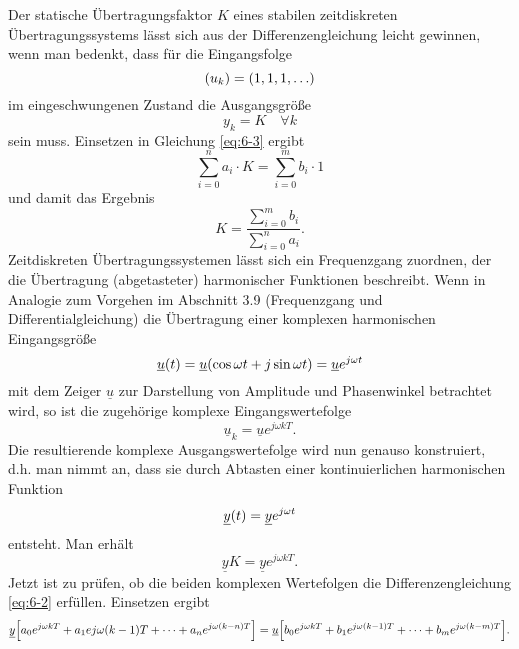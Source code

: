 Der statische Übertragungsfaktor \(K\) eines stabilen zeitdiskreten Übertragungssystems lässt sich aus der Differenzengleichung leicht gewinnen, wenn man bedenkt, dass für die Eingangsfolge
\begin{equation}
	\parentheses*{u_k} = \parentheses*{1, 1, 1, \ldots}
\end{equation}
im eingeschwungenen Zustand die Ausgangsgröße
\begin{equation}
	y_k = K \quad \forall k
\end{equation}
sein muss.
Einsetzen in Gleichung \eqref{eq:6-3} ergibt
\begin{equation}
	\sum_{i = 0}^n a_i \cdot K = \sum_{i = 0}^m b_i \cdot 1
\end{equation}
und damit das Ergebnis
\begin{equation}
	K = \frac{\sum_{i = 0}^m b_i}{\sum_{i = 0}^n a_i}.
\end{equation}
Zeitdiskreten Übertragungssystemen lässt sich ein Frequenzgang zuordnen, der die Übertragung (abgetasteter) harmonischer Funktionen beschreibt.
Wenn in Analogie zum Vorgehen im Abschnitt 3.9 (Frequenzgang und Differentialgleichung) die Übertragung einer komplexen harmonischen Eingangsgröße
\begin{equation}
	\underline{u}\parentheses*{t} = \underline{u}\parentheses*{\cos\omega t + j\sin\omega t} = \underline{u}e^{j\omega t}
\end{equation}
mit dem Zeiger \(\underline{u}\) zur Darstellung von Amplitude und Phasenwinkel betrachtet wird, so ist die zugehörige komplexe Eingangswertefolge
\begin{equation}
	\underline{u}_k = \underline{u}e^{j\omega kT}.
\end{equation}
Die resultierende komplexe Ausgangswertefolge wird nun genauso konstruiert, d.h. man nimmt an, dass sie durch Abtasten einer kontinuierlichen harmonischen Funktion
\begin{equation}
	\underline{y}\parentheses*{t} = \underline{y}e^{j\omega t}
\end{equation}
entsteht.
Man erhält
\begin{equation}
	\underline{y}K = \underline{y}e^{j\omega kT}.
\end{equation}
Jetzt ist zu prüfen, ob die beiden komplexen Wertefolgen die Differenzengleichung \eqref{eq:6-2} erfüllen.
Einsetzen ergibt
\begin{equation}
	\underline{y}\brackets*{a_0 e^{j\omega kT} + a_1 e {j\omega\parentheses*{k - 1}T} + \cdots + a_n e^{j\omega\parentheses*{k - n}T}} = \underline{u}\brackets*{b_0 e^{j\omega kT} + b_1 e^{j\omega\parentheses*{k - 1}T} + \cdots + b_m e^{j\omega\parentheses*{k - m}T}}.
\end{equation}
